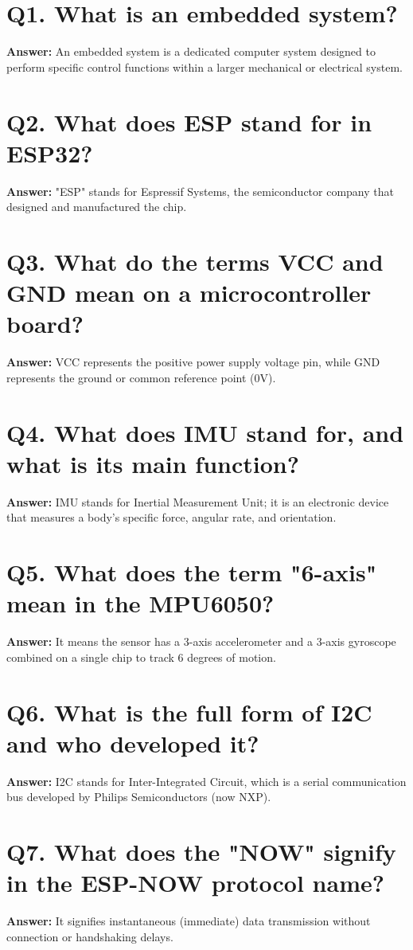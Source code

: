 \documentclass[12pt,a4paper,oneside]{report}
\begin{document}
\section{Q1. What is an embedded system?}
\textbf{Answer:} An embedded system is a dedicated computer system designed to perform specific control functions within a larger mechanical or electrical system.

\section{Q2. What does ESP stand for in ESP32?}
\textbf{Answer:} "ESP" stands for Espressif Systems, the semiconductor company that designed and manufactured the chip.

\section{Q3. What do the terms VCC and GND mean on a microcontroller board?}
\textbf{Answer:} VCC represents the positive power supply voltage pin, while GND represents the ground or common reference point (0V).

\section{Q4. What does IMU stand for, and what is its main function?}
\textbf{Answer:} IMU stands for Inertial Measurement Unit; it is an electronic device that measures a body's specific force, angular rate, and orientation.

\section{Q5. What does the term "6-axis" mean in the MPU6050?}
\textbf{Answer:} It means the sensor has a 3-axis accelerometer and a 3-axis gyroscope combined on a single chip to track 6 degrees of motion.

\section{Q6. What is the full form of I2C and who developed it?}
\textbf{Answer:} I2C stands for Inter-Integrated Circuit, which is a serial communication bus developed by Philips Semiconductors (now NXP).

\section{Q7. What does the "NOW" signify in the ESP-NOW protocol name?}
\textbf{Answer:} It signifies instantaneous (immediate) data transmission without connection or handshaking delays.
\end{document}
